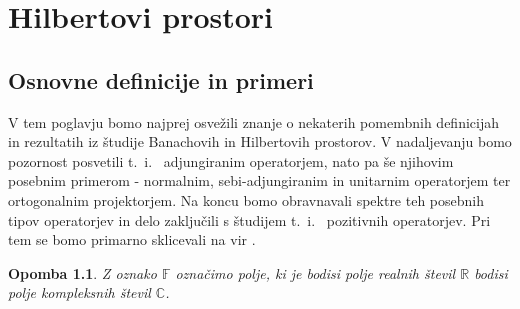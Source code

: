\documentclass[12pt,a4paper,oneside,fleqn,openany]{book}
\newtheorem{opomba}[izrek]{Opomba}
\newcommand{\R}{\mathbb{R}}
\newcommand{\F}{\mathbb{F}}
\newcommand{\C}{\mathbb{C}}
\begin{document}
\chapter{Hilbertovi prostori}

\section[Osnovne definicije in primeri]{Osnovne definicije in primeri}

	V tem poglavju bomo najprej osvežili znanje o nekaterih pomembnih definicijah in rezultatih iz študije Banachovih in Hilbertovih prostorov. V nadaljevanju bomo pozornost posvetili t.~i.~ adjungiranim operatorjem, nato pa še njihovim posebnim primerom - normalnim, sebi-adjungiranim in unitarnim operatorjem ter ortogonalnim projektorjem. Na koncu bomo obravnavali spektre teh posebnih tipov operatorjev in delo zaključili s študijem t.~i.~ pozitivnih operatorjev. Pri tem se bomo primarno sklicevali na vir \cite{bib:Rynne}.

\begin{opomba}
	\label{opomb:poljeF} Z oznako $\F$ označimo polje, ki je bodisi polje realnih števil $\R$ bodisi polje kompleksnih števil $\C$.
\end{opomba}
\end{document}
